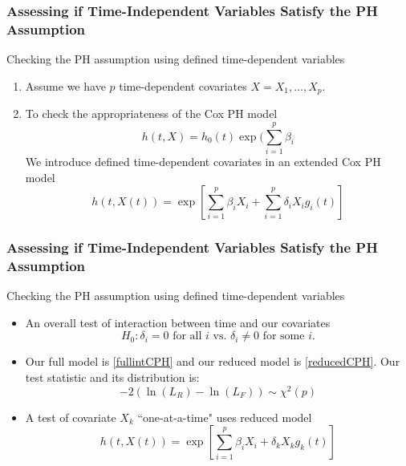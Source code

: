 \documentclass{beamer}
\theoremstyle{definition}
\begin{document}
\begin{frame}
\frametitle{Assessing if Time-Independent Variables Satisfy the PH Assumption}
\begin{block}{Checking the PH assumption using defined time-dependent variables}
\begin{enumerate}
\item Assume we have $p$ time-dependent covariates $X=X_1,\ldots,X_p$.
\item To check the appropriateness of the Cox PH model
\begin{equation} \label{reducedCPH}
h(t,X) = h_0(t)\exp(\sum_{i=1}^p \beta_i
\end{equation}
We introduce defined time-dependent covariates in an extended Cox PH model
\begin{equation} \label{fullintCPH}
h(t,X(t)) = \exp[\sum_{i=1}^p \beta_i X_i + \sum_{i=1}^p \delta_i X_i g_i(t)]
\end{equation}
\end{enumerate}
\end{block}
\end{frame}


\begin{frame}
\frametitle{Assessing if Time-Independent Variables Satisfy the PH Assumption}
\begin{block}{Checking the PH assumption using defined time-dependent variables}
\begin{itemize}
\item An overall test of interaction between time and our covariates
\[
H_0: \delta_i = 0 \text{ for all } i \text{ vs. } \delta_i \neq 0 \text{ for some } i.
\]
\item Our full model is \eqref{fullintCPH} and our reduced model is \eqref{reducedCPH}. Our test statistic and its distribution is:
\vspace{-10pt}
\[
-2(\ln(L_R) - \ln(L_F)) \sim \chi^2(p)
\]
\item A test of covariate $X_k$ ``one-at-a-time" uses reduced model
\vspace{-10pt}
\[
h(t,X(t)) = \exp\left[\sum_{i=1}^p \beta_i X_i + \delta_k X_k g_k(t)\right]
\]
\end{itemize}
\end{block}
\end{frame}
\end{document}
